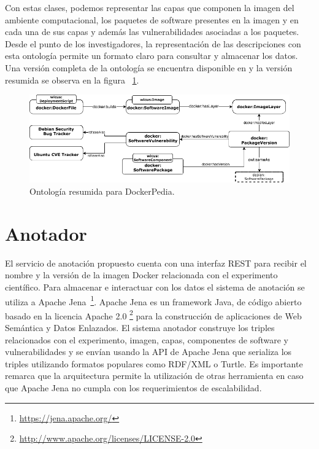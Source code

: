 Con estas clases, podemos representar las capas que componen la imagen del ambiente computacional, los paquetes de software presentes en la imagen y en cada una de sus capas y además las vulnerabilidades asociadas a los paquetes.
Desde el punto de los investigadores, la representación de las descripciones con esta ontología permite un formato claro para consultar y almacenar los datos.
Una versión completa de la ontología se encuentra disponible en \cite{dockerpedia-ontology} y la versión resumida se observa en la figura ~\ref{fig:ontology}. 

\begin{figure}[t]
  \centering
    \includegraphics[width=1\textwidth]{Figures/dockerOntologyBasic.png}
      \caption{Ontología resumida para DockerPedia.}
     \label{fig:ontology}

\end{figure}

\section{Anotador}\label{s4.2}

El servicio de anotación propuesto cuenta con una interfaz REST para recibir el nombre y la versión de la imagen Docker relacionada con el experimento científico. 
Para almacenar e interactuar con los datos el sistema de anotación se utiliza a Apache Jena~\footnote{\url{https://jena.apache.org/}}. Apache Jena es un framework Java, de código abierto basado en la licencia Apache 2.0 \footnote{\url{http://www.apache.org/licenses/LICENSE-2.0}} para la construcción de aplicaciones de Web Semántica y Datos Enlazados. 
El sistema anotador construye los triples relacionados con el experimento, imagen, capas, componentes de software y vulnerabilidades y se envían usando la API de Apache Jena que serializa los triples utilizando formatos populares como RDF/XML o Turtle.
Es importante remarca que la arquitectura permite la utilización de otras herramienta en caso que Apache Jena no cumpla con los requerimientos de escalabilidad.

